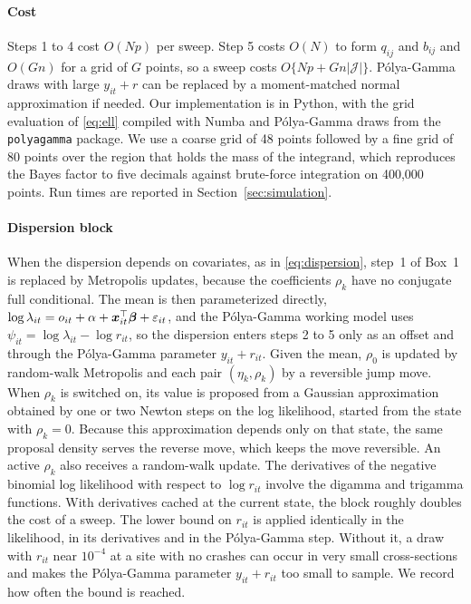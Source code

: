 \paragraph{Cost} Steps 1 to 4 cost $O(Np)$ per sweep. Step 5 costs $O(N)$ to form $q_{ij}$ and $b_{ij}$ and $O(Gn)$ for a grid of $G$ points, so a sweep costs $O\{Np+Gn|\mathcal J|\}$. P\'olya-Gamma draws with large $y_{it}+r$ can be replaced by a moment-matched normal approximation if needed. Our implementation is in Python, with the grid evaluation of \eqref{eq:ell} compiled with Numba and P\'olya-Gamma draws from the \texttt{polyagamma} package. We use a coarse grid of 48 points followed by a fine grid of 80 points over the region that holds the mass of the integrand, which reproduces the Bayes factor to five decimals against brute-force integration on 400{,}000 points. Run times are reported in Section~\ref{sec:simulation}.

\paragraph{Dispersion block} When the dispersion depends on covariates, as in \eqref{eq:dispersion}, step~1 of Box~1 is replaced by Metropolis updates, because the coefficients $\rho_k$ have no conjugate full conditional. The mean is then parameterized directly, $\log\lambda_{it}=o_{it}+\alpha+\bm{x}_{it}^\top\bm{\beta}+\varepsilon_{it}$, and the P\'olya-Gamma working model uses $\psi_{it}=\log\lambda_{it}-\log r_{it}$, so the dispersion enters steps 2 to 5 only as an offset and through the P\'olya-Gamma parameter $y_{it}+r_{it}$. Given the mean, $\rho_0$ is updated by random-walk Metropolis and each pair $(\eta_k,\rho_k)$ by a reversible jump move. When $\rho_k$ is switched on, its value is proposed from a Gaussian approximation obtained by one or two Newton steps on the log likelihood, started from the state with $\rho_k=0$. Because this approximation depends only on that state, the same proposal density serves the reverse move, which keeps the move reversible. An active $\rho_k$ also receives a random-walk update. The derivatives of the negative binomial log likelihood with respect to $\log r_{it}$ involve the digamma and trigamma functions. With derivatives cached at the current state, the block roughly doubles the cost of a sweep. The lower bound on $r_{it}$ is applied identically in the likelihood, in its derivatives and in the P\'olya-Gamma step. Without it, a draw with $r_{it}$ near $10^{-4}$ at a site with no crashes can occur in very small cross-sections and makes the P\'olya-Gamma parameter $y_{it}+r_{it}$ too small to sample. We record how often the bound is reached.

